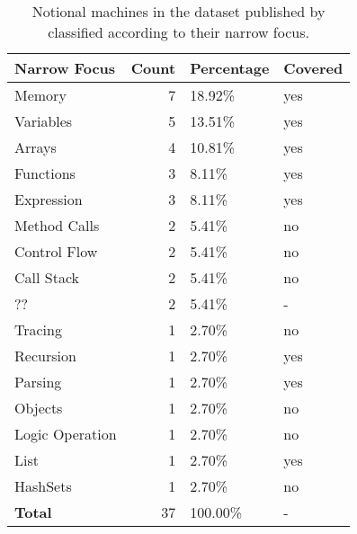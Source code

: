 \begin{table}[]
\begin{tabular}{|l||r|l|l|}
\hline
\textbf{Narrow Focus} & \textbf{Count} & \textbf{Percentage} & \textbf{Covered} \\
\hline
\hline
Memory          & 7     & 18.92\%   & yes \\ \hline
Variables       & 5     & 13.51\%   & yes \\ \hline
Arrays          & 4     & 10.81\%   & yes \\ \hline
Functions       & 3     & 8.11\%    & yes \\ \hline
Expression      & 3     & 8.11\%    & yes \\ \hline
Method Calls    & 2     & 5.41\%    & no  \\ \hline
Control Flow    & 2     & 5.41\%    & no  \\ \hline
Call Stack      & 2     & 5.41\%    & no  \\ \hline
??              & 2     & 5.41\%    & -   \\ \hline
Tracing         & 1     & 2.70\%    & no  \\ \hline
Recursion       & 1     & 2.70\%    & yes \\ \hline
Parsing         & 1     & 2.70\%    & yes \\ \hline
Objects         & 1     & 2.70\%    & no  \\ \hline
Logic Operation & 1     & 2.70\%    & no  \\ \hline
List            & 1     & 2.70\%    & yes \\ \hline
HashSets        & 1     & 2.70\%    & no  \\ \hline
\hline
\textbf{Total} & 37    & 100.00\%   & -   \\
\hline
\end{tabular}
\caption{Notional machines in the dataset published by \citet{fincherNotionalMachinesComputing2020} classified according to their narrow focus.}
\label{tab:nm-classification-narrow-focus}
\end{table}

